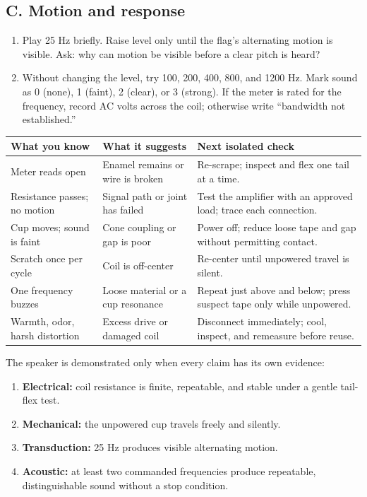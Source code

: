 \subsection{C. Motion and response}
\begin{enumerate}[resume]
\item Play 25 Hz briefly. Raise level only until the flag's alternating motion
is visible. Ask: why can motion be visible before a clear pitch is heard?
\item Without changing the level, try 100, 200, 400, 800, and 1200 Hz. Mark
sound as 0 (none), 1 (faint), 2 (clear), or 3 (strong). If the meter is rated
for the frequency, record AC volts across the coil; otherwise write
``bandwidth not established.''
\end{enumerate}

\begin{tabularx}{\linewidth}{@{}p{.23\linewidth}p{.27\linewidth}L@{}}
\toprule
\textbf{What you know} & \textbf{What it suggests} & \textbf{Next isolated check}\\
\midrule
Meter reads open & Enamel remains or wire is broken & Re-scrape; inspect and
flex one tail at a time.\\
Resistance passes; no motion & Signal path or joint has failed & Test the
amplifier with an approved load; trace each connection.\\
Cup moves; sound is faint & Cone coupling or gap is poor & Power off;
reduce loose tape and gap without permitting contact.\\
Scratch once per cycle & Coil is off-center & Re-center until unpowered travel
is silent.\\
One frequency buzzes & Loose material or a cup resonance & Repeat just above
and below; press suspect tape only while unpowered.\\
Warmth, odor, harsh distortion & Excess drive or damaged coil & Disconnect
immediately; cool, inspect, and remeasure before reuse.\\
\bottomrule
\end{tabularx}

The speaker is demonstrated only when every claim has its own evidence:
\begin{enumerate}[label=\(\circ\),leftmargin=1.8em]
\item \textbf{Electrical:} coil resistance is finite, repeatable, and stable
under a gentle tail-flex test.
\item \textbf{Mechanical:} the unpowered cup travels freely and silently.
\item \textbf{Transduction:} 25 Hz produces visible alternating motion.
\item \textbf{Acoustic:} at least two commanded frequencies produce repeatable,
distinguishable sound without a stop condition.
\end{enumerate}

